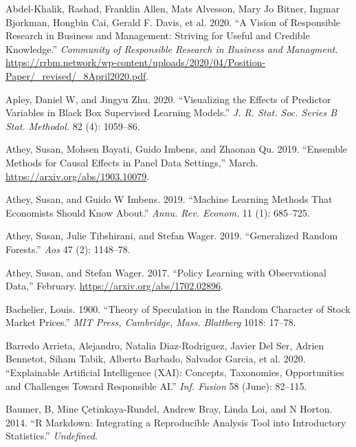 \documentclass{article}
\newlength{\cslhangindent}
\newlength{\cslentryspacingunit} %
\newenvironment{CSLReferences}[2] %
 {%
  \setlength{\parindent}{0pt}
  \ifodd #1
  \let\oldpar\par
  \def\par{\hangindent=\cslhangindent\oldpar}
  \fi
  \setlength{\parskip}{#2\cslentryspacingunit}
 }%
 {}
\begin{document}
\hypertarget{refs}{}
\begin{CSLReferences}{1}{0}
\leavevmode{}%
Abdel-Khalik, Rashad, Franklin Allen, Mats Alvesson, Mary Jo Bitner,
Ingmar Bjorkman, Hongbin Cai, Gerald F. Davis, et al. 2020. {``{A Vision
of Responsible Research in Business and Management: Striving for Useful
and Credible Knowledge}.''} \emph{Community of Responsible Research in
Business and Managment}.
\url{https://rrbm.network/wp-content/uploads/2020/04/Position-Paper/_revised/_8April2020.pdf}.

\leavevmode{}%
Apley, Daniel W, and Jingyu Zhu. 2020. {``Visualizing the Effects of
Predictor Variables in Black Box Supervised Learning Models.''} \emph{J.
R. Stat. Soc. Series B Stat. Methodol.} 82 (4): 1059--86.

\leavevmode{}%
Athey, Susan, Mohsen Bayati, Guido Imbens, and Zhaonan Qu. 2019.
{``Ensemble Methods for Causal Effects in Panel Data Settings,''} March.
\url{https://arxiv.org/abs/1903.10079}.

\leavevmode{}%
Athey, Susan, and Guido W Imbens. 2019. {``Machine Learning Methods That
Economists Should Know About.''} \emph{Annu. Rev. Econom.} 11 (1):
685--725.

\leavevmode{}%
Athey, Susan, Julie Tibshirani, and Stefan Wager. 2019. {``Generalized
Random Forests.''} \emph{Aos} 47 (2): 1148--78.

\leavevmode{}%
Athey, Susan, and Stefan Wager. 2017. {``Policy Learning with
Observational Data,''} February. \url{https://arxiv.org/abs/1702.02896}.

\leavevmode{}%
Bachelier, Louis. 1900. {``Theory of Speculation in the Random Character
of Stock Market Prices.''} \emph{MIT Press, Cambridge, Mass. Blattberg}
1018: 17--78.

\leavevmode{}%
Barredo Arrieta, Alejandro, Natalia Diaz-Rodriguez, Javier Del Ser,
Adrien Bennetot, Siham Tabik, Alberto Barbado, Salvador Garcia, et al.
2020. {``Explainable Artificial Intelligence ({XAI)}: Concepts,
Taxonomies, Opportunities and Challenges Toward Responsible {AI}.''}
\emph{Inf. Fusion} 58 (June): 82--115.

\leavevmode{}%
Baumer, B, Mine Çetinkaya-Rundel, Andrew Bray, Linda Loi, and N Horton.
2014. {``{R} Markdown: Integrating a Reproducible Analysis Tool into
Introductory Statistics.''} \emph{Undefined}.


\end{CSLReferences}
\end{document}
